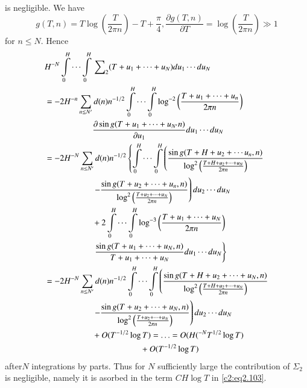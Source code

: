 is negligible. We have
$$
g(T, n) = T \log \left(\frac{T}{2 \pi n} \right)- T + \frac{\pi}{4},
\frac{\partial g (T, n)}{\partial T}= \log \left(\frac{T}{2 \pi n}
\right) \gg 1 
$$
for $n \leq N$. Hence
\begin{align*}
  & H^{-N}\int\limits_0^H \cdots \int\limits_0^H \sideset{}{_2}\sum (T +
  u_1 + \cdots + u_N) du_1 \cdots du_N \\
  & =- 2H^{-n} \sum_{n \leq N'} d(n) n^{-1/2} \int\limits_0^H\cdots
  \int\limits_0^H \log^{-2} \left(\frac{T+u_1 + \cdots + u_n}{2 \pi n}
  \right) \\
& \hspace{2cm}  \frac{\partial \sin g (T+u_1 + \cdots + u_{N'}n)}{\partial
    u_1} du_1 \cdots du_N\\
  & = - 2H^{-N} \sum_{n \leq N'} d(n) n^{-1/2} \left\{\int\limits_0^H
  \cdots \int\limits_0^H \left(\frac{\sin g (T + H + u_2 + \cdots u_n,
    n)}{\log^2 \left(\frac{T+ H+ u_2 + \cdots + u_N}{2 \pi n}
    \right)} \right. \right. \\
& \hspace{2cm} \left. - \frac{\sin g (T + u_2 + \cdots + u_n, n)}{\log^2
    \left(\frac{T+ u_2 + \cdots + u_N}{2 \pi n} \right)} \right) du_2
  \cdots du_N\\
  & \hspace{2cm} + 2 \int\limits_0^H \cdots \int\limits_0^H \log^{-3}
  \left(\frac{T+ u_1 + \cdots + u_N}{2 \pi n} \right) \\
& \hspace{2cm} \left.  \frac{\sin g (T
    + u_1 + \cdots + u_N, n)}{T+ u_1 + \cdots + u_N} du_1 \cdots
  du_N\right\}\\
  & = - 2 H^{-N} \sum_{n \leq N'} d(n) n^{-1/2} \int\limits_0^H \cdots
  \int\limits_0^H  \left(\frac{\sin g (T + H+ u_2 + \cdots + u_N,
    n)}{\log^2 \left(\frac{T+H+ u_2 + \cdots + u_N}{2 \pi n} \right)} \right.\\
& \hspace{2cm} \left.  - \frac{\sin g (T + u_2 + \cdots + u_N, n)}{\log^2 \left(\frac{T+u_2
      + \cdots + u_N}{2 \pi n}\right)}\right) du_2 \cdots du_N\\
  & \hspace{2cm}+ O(T^{-1/2}\log T)= \ldots =  O(H(^{-N}T^{1/2} \log
  T) \\
& \hspace{4cm} + O(T^{-1/2} \log T)
\end{align*}
after\pageoriginale $N$ integrations by parts. Thus for $N$
sufficiently large the contribution of $\Sigma_2$ is negligible,
namely it is asorbed in the term $CH \log T$ in \eqref{c2:eq2.103}.

